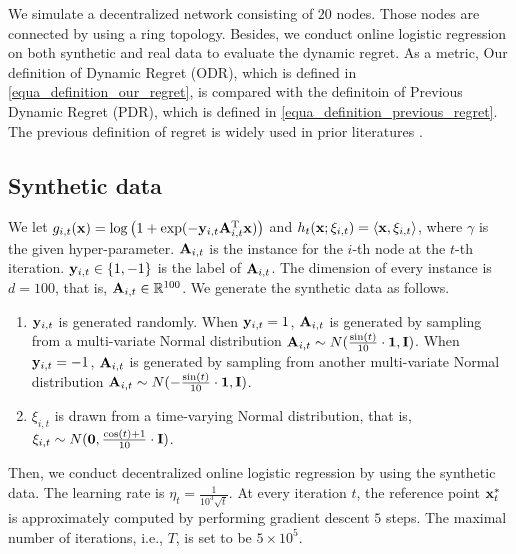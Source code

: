 \documentclass{article}
\begin{document}
We simulate a decentralized network consisting of $20$ nodes. Those nodes are connected by using a ring topology. Besides, we conduct online logistic regression on both synthetic and real data to evaluate the dynamic regret. As a metric, Our definition of Dynamic Regret (ODR), which is defined in \eqref{equa_definition_our_regret}, is compared with the  definitoin of Previous  Dynamic Regret (PDR), which is defined in \eqref{equa_definition_previous_regret}. The previous definition of regret is widely used in prior literatures \citep{Zinkevich:2003,Gyorgy:2016,8015179Shahram,Zhao:2018wx}. 


\subsection{Synthetic data}
We let $g_{i,t}({\bf x}) = \log\left( 1+\exp(-{\bf y}_{i,t}{\bf A}_{i,t}^{\rm T} {\bf x}) \right)$ and $h_t({\bf x};\xi_{i,t}) = \left\langle{\bf x}, \xi_{i,t} \right\rangle$, where $\gamma$ is the given hyper-parameter. ${\bf A}_{i,t}$ is the instance for the $i$-th node at the $t$-th iteration. ${\bf y}_{i,t}\in\{1,-1\}$ is the label of ${\bf A}_{i,t}$. The dimension of every instance is $d = 100$, that is, ${\bf A}_{i,t}\in\mathbb{R}^{100}$. We generate the synthetic data as follows.
\begin{enumerate}
\item ${\bf y}_{i,t}$ is generated randomly. When ${\bf y}_{i,t}=1$, ${\bf A}_{i,t}$ is generated by sampling from a multi-variate Normal distribution ${\bf A}_{i,t} \sim N(\frac{\sin(t)}{10}\cdot{\bf 1}, {\bf I})$. When ${\bf y}_{i,t} = -1$, ${\bf A}_{i,t}$ is generated by sampling from another multi-variate Normal distribution ${\bf A}_{i,t} \sim N(-\frac{\sin(t)}{10}\cdot{\bf 1}, {\bf I})$.
\item $\xi_{i,t}$ is drawn from a time-varying Normal distribution, that is, $\xi_{i,t} \sim N({\bf 0}, \frac{\cos(t)+1}{10}\cdot{\bf I})$.
\end{enumerate}    Then, we conduct decentralized online logistic regression by using the synthetic data.  The learning rate is $\eta_t = \frac{1}{10^3\sqrt{t}}$. At every iteration $t$, the reference point ${\bf x}_t^\ast$ is approximately computed by performing  gradient descent $5$ steps. The maximal number of iterations, i.e., $T$, is set to be $5\times 10^5$.  
\end{document}
